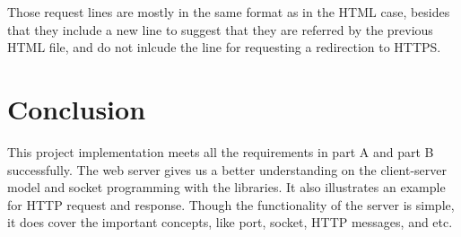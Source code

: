 \documentclass[a4paper, 11pt]{report}
\begin{document}
\noindent Those request lines are mostly in the same format as in the HTML case, besides that they include a new line to suggest that they are referred by the previous HTML file, and do not inlcude the line for requesting a redirection to HTTPS.



\section*{Conclusion}

This project implementation meets all the requirements in part A and part B successfully. The web server gives us a better understanding on the client-server model and socket programming with the libraries. It also illustrates an example for HTTP request and response. Though the functionality of the server is simple, it does cover the important concepts, like port, socket, HTTP messages, and etc.
\end{document}
